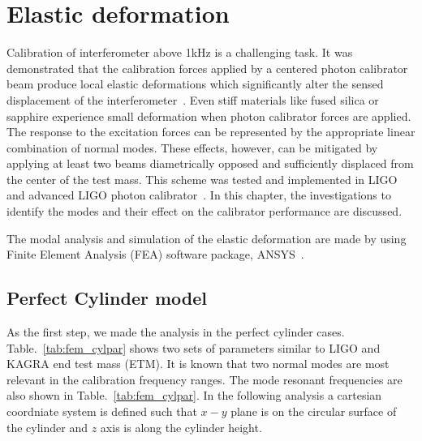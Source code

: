 

\chapter{Elastic deformation} %

\label{Chapter4} %
Calibration of interferometer above 1kHz is a challenging task. 
It was demonstrated that the calibration forces applied by a centered 
photon calibrator beam produce local elastic deformations which 
significantly alter the sensed displacement of the 
interferometer~\cite{Hild:2007,Goetz:2009}.
Even stiff materials like fused silica or sapphire experience small 
deformation when photon calibrator forces are applied. The response to 
the excitation forces can be represented by the appropriate linear 
combination of normal modes. These effects, however, can be mitigated 
by applying at least two beams diametrically opposed and sufficiently 
displaced from the center of the test mass. 
This scheme was tested and implemented in LIGO and advanced LIGO photon 
calibrator~\cite{Daveloza,Karki}.
In this chapter, the investigations to identify 
the modes and their effect on the calibrator performance are discussed.  

The modal analysis and simulation of the elastic deformation are made 
by using Finite Element Analysis (FEA) software package, ANSYS~\cite{ANSYS}. 


\section{Perfect Cylinder model}

As the first step, we made the analysis in the perfect cylinder cases.
Table.~\ref{tab:fem_cylpar} shows two sets of parameters similar to LIGO 
and KAGRA end test mass (ETM). 
It is known that two normal modes are most relevant in the calibration 
frequency ranges. The mode resonant frequencies are also shown 
in Table.~\ref{tab:fem_cylpar}.
In the following analysis a cartesian coordniate system is defined 
such that $x-y$ plane is on the circular surface of the cylinder 
and $z$ axis is along the cylinder height.

